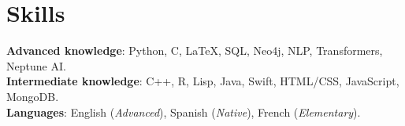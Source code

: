 \documentclass[letterpaper,11pt]{article}
\begin{document}



%
\section{Skills}
 \begin{itemize}[leftmargin=0.15in, label={}]
    \small{\item{
     \textbf{Advanced knowledge}{: Python, C, \LaTeX, SQL, Neo4j, NLP, Transformers, Neptune AI.} \\
     \textbf{Intermediate knowledge}{: C++, R, Lisp, Java, Swift, HTML/CSS, JavaScript, MongoDB.} \\
     \textbf{Languages}{: English (\textit{Advanced}), Spanish (\textit{Native}), French (\textit{Elementary})}.
    }}
 \end{itemize}


\end{document}
